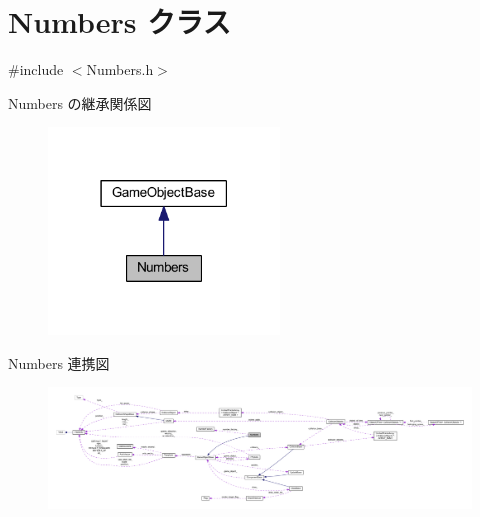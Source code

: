 \hypertarget{class_numbers}{}\section{Numbers クラス}
\label{class_numbers}


{\ttfamily \#include $<$Numbers.\+h$>$}



Numbers の継承関係図\nopagebreak
\begin{figure}[H]
\begin{center}
\leavevmode
\includegraphics[width=174pt]{class_numbers__inherit__graph}
\end{center}
\end{figure}


Numbers 連携図\nopagebreak
\begin{figure}[H]
\begin{center}
\leavevmode
\includegraphics[width=350pt]{class_numbers__coll__graph}
\end{center}
\end{figure}
